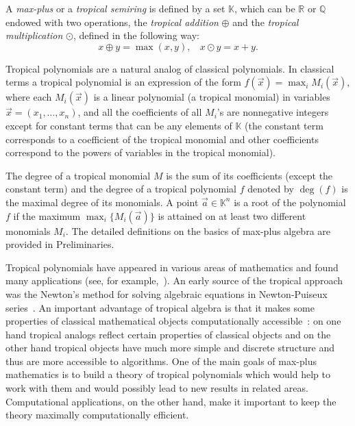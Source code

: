 \documentclass[11pt]{article}
\newcommand{\ta}{\oplus}
\newcommand{\tp}{\odot}
\newcommand{\bb}[1]{\mathbb{#1}}
\begin{document}
A \emph{max-plus} or a \emph{tropical semiring} is defined by a set $\bb{K}$, which can be $\mathbb{R}$ or $\mathbb{Q}$
endowed with two operations, the \emph{tropical addition} $\ta$ and the \emph{tropical multiplication} $\tp$, defined in
the following way:
$$
x \ta y = \max\left(x,y\right), \ \ \ \ x \tp y = x + y.
$$

Tropical polynomials are a natural analog of classical polynomials.
In classical terms a tropical polynomial is an expression of the form $f(\vec{x}) = \max_i M_i(\vec{x})$,
where each $M_i(\vec{x})$ is a linear polynomial (a tropical monomial) in variables $\vec{x} = (x_1, \ldots, x_n)$,
and all the coefficients of all $M_i$'s are nonnegative integers except for constant terms that can be any elements of $\bb{K}$ (the constant term corresponds to a coefficient of the tropical monomial and other coefficients correspond to the powers of variables in the tropical monomial). 

The degree of a tropical monomial $M$ is the sum of its coefficients (except the constant term) and
the degree of a tropical polynomial $f$ denoted by $\deg(f)$ is the maximal degree of its monomials.
A point $\vec{a} \in \bb{K}^n$ is a root of the polynomial $f$ if the maximum $\max_i\{M_i(\vec{a})\}$
is attained on at least two different monomials $M_i$.
The detailed definitions on the basics of max-plus algebra are provided in Preliminaries.

Tropical polynomials have appeared in various areas of mathematics and found many applications (see, for example,~\cite{IMS2009tropical,MS2015tropical,sturmfels02equations,Mikhalkin2004survey,RGST05first_steps,HuberS95polyhedral,Vorobyev67}). An early source of the tropical approach was the Newton's method for solving
algebraic equations in Newton-Puiseux series~\cite{sturmfels02equations}.
An important advantage of tropical algebra is that it makes some properties of classical mathematical objects computationally accessible~\cite{theobald06frontiers,IMS2009tropical,MS2015tropical,sturmfels02equations}:
on one hand tropical analogs reflect certain properties of classical objects and on the other hand tropical objects have much more simple and discrete structure and thus are more accessible to algorithms.
One of the main goals of max-plus mathematics is to build a theory of tropical polynomials which would help to work with
them and would possibly lead to new results in related areas. Computational applications, on the other hand, make
it important to keep the theory maximally computationally efficient.
\end{document}
